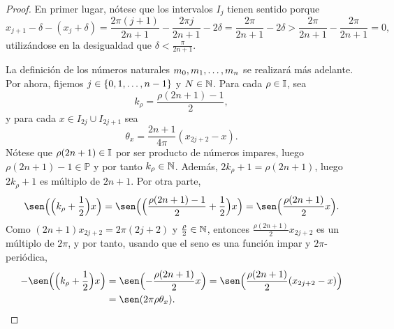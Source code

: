 \documentclass[a4paper, 12pt, oneside]{book}
\begin{document}
\begin{proof}
    En primer lugar, nótese que los intervalos $I_j$ tienen sentido porque
    \[x_{j+1}-\delta -(x_j+\delta) = \frac{2\pi(j+1)}{2n+1}-\frac{2\pi j}{2n+1} -2\delta = \frac{2\pi}{2n+1}-2\delta > \frac{2\pi}{2n+1}-\frac{2\pi}{2n+1} = 0,\]
    utilizándose en la desigualdad que $\delta < \frac{\pi}{2n+1}$.

    La definición de los números naturales $m_0,m_1,\mathellipsis,m_n$ se realizará más adelante. Por ahora, fijemos $j \in \{0,1,\mathellipsis,n-1\}$ y $N \in \mathbb N$. Para cada $\rho \in \mathbb I$, sea \[k_\rho = \frac{\rho(2n+1)-1}{2},\]
    y para cada $x \in I_{2j} \cup I_{2j+1}$ sea
    \[\theta_x = \frac{2n+1}{4\pi}(x_{2j+2}-x).\]
    Nótese que $\rho(2n+1) \in \mathbb I$ por ser producto de números impares, luego $\rho(2n+1)-1 \in \mathbb{P}$ y por tanto $k_\rho \in \mathbb N$. Además, $2k_\rho+1=\rho(2n+1)$, luego $2k_\rho+1$ es múltiplo de $2n+1$. Por otra parte,
    \[\sen\Bigl(\Bigl(k_\rho+\frac{1}{2}\Bigr)x\Bigr) = \sen\Bigl(\Bigl(\frac{\rho(2n+1)-1}{2}+\frac{1}{2}\Bigr)x\Bigr) = \sen\Bigl(\frac{\rho(2n+1)}{2}x\Bigr).\]
    Como $(2n+1)x_{2j+2} = 2\pi(2j+2)$ y $\frac{\rho}{2} \in \mathbb N$, entonces $\frac{\rho(2n+1)}{2}x_{2j+2}$ es un múltiplo de $2\pi$, y por tanto, usando que el seno es una función impar y $2\pi$-periódica,
    \begin{align}\label{2.2.11}
        -\sen\Bigl(\Bigl(k_\rho+\frac{1}{2}\Bigr)x\Bigr) &= \sen\Bigl(-\frac{\rho(2n+1)}{2}x\Bigr) = \sen\Bigl(\frac{\rho(2n+1)}{2}(x_{2j+2}-x)\Bigr) \notag \\ 
        &= \sen(2\pi \rho\theta_x).
    \end{align}
    

\end{proof}
\end{document}
